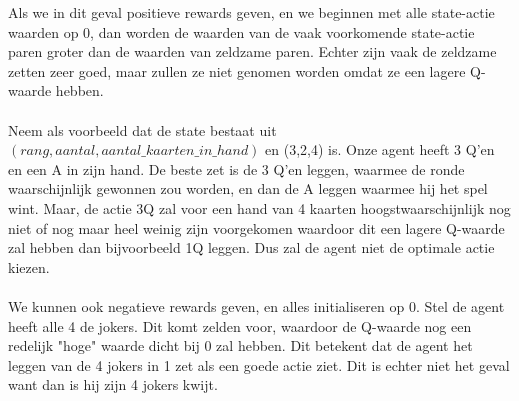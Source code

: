 \documentclass[11pt]{article}
\begin{document}
Als we in dit geval positieve rewards geven, en we beginnen met alle state-actie waarden op 0,  dan worden de waarden van de vaak voorkomende state-actie paren groter dan de waarden van zeldzame paren. Echter zijn vaak de zeldzame zetten zeer goed, maar zullen ze niet genomen worden omdat ze een lagere Q-waarde hebben. \\\\
Neem als voorbeeld dat de state bestaat uit $(rang, aantal, aantal\_kaarten\_in\_hand)$ en (3,2,4) is. Onze agent heeft 3 Q'en en een A in zijn hand. De beste zet is de 3 Q'en leggen, waarmee de ronde waarschijnlijk gewonnen zou worden, en dan de A leggen waarmee hij het spel wint. Maar, de actie 3Q zal voor een hand van 4 kaarten hoogstwaarschijnlijk nog niet of nog maar heel weinig zijn voorgekomen waardoor dit een lagere Q-waarde zal hebben dan bijvoorbeeld 1Q leggen. Dus zal de agent niet de optimale actie kiezen.\\\\
We kunnen ook negatieve rewards geven, en alles initialiseren op 0. Stel de agent heeft alle 4 de jokers. Dit komt zelden voor, waardoor de Q-waarde nog een redelijk "hoge" waarde dicht bij 0 zal hebben. Dit betekent dat de agent het leggen van de 4 jokers in 1 zet als een goede actie ziet. Dit is echter niet het geval want dan is hij zijn 4 jokers kwijt.\\\\
\end{document}
